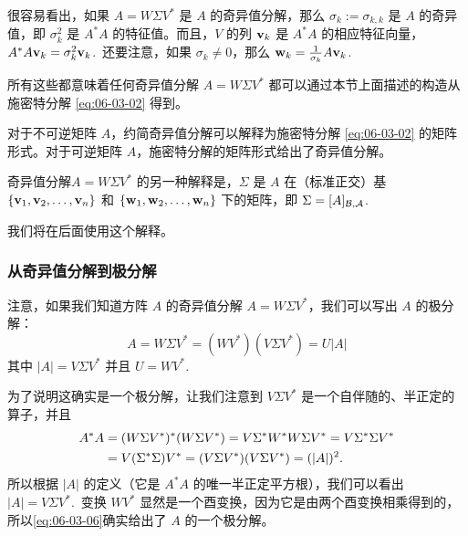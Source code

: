 \begin{remark}\label{stmt:06-03-10}
很容易看出，如果 $A = W \Sigma V^*$ 是 $A$ 的奇异值分解，那么 $\sigma_k := \sigma_{k,k}$ 是 $A$ 的奇异值，即 $\sigma_k^2$ 是 $A^*A$ 的特征值。而且，$V$ 的列 $\mathbf{v}_k$ 是 $A^*A$ 的相应特征向量，$A^*A\mathbf{v}_k = \sigma_k^2 \mathbf{v}_k$.~还要注意，如果 $\sigma_k \neq 0$，那么 $\mathbf{w}_k = \frac{1}{\sigma_k} A\mathbf{v}_k$.~
\end{remark}

所有这些都意味着任何奇异值分解 $A = W \Sigma V^*$ 都可以通过本节上面描述的构造从施密特分解 \eqref{eq:06-03-02} 得到。

对于不可逆矩阵 $A$，约简奇异值分解可以解释为施密特分解 \eqref{eq:06-03-02} 的矩阵形式。对于可逆矩阵 $A$，施密特分解的矩阵形式给出了奇异值分解。

\begin{remark}\label{stmt:06-03-11}
奇异值分解$A = W \Sigma V^*$ 的另一种解释是，$\Sigma$ 是 $A$ 在（标准正交）基 $\{\mathbf{v}_1, \mathbf{v}_2, \dots, \mathbf{v}_n\}$ 和 $\{\mathbf{w}_1, \mathbf{w}_2, \dots, \mathbf{w}_n\}$ 下的矩阵，即 $\Sigma = [A]_{\mathcal{B},\mathcal{A}}$.~
\end{remark}

我们将在后面使用这个解释。

\subsubsection{从奇异值分解到极分解}\label{sec:06-03-04-01}

注意，如果我们知道方阵 $A$ 的奇异值分解 $A = W \Sigma V^*$，我们可以写出 $A$ 的极分解：
\begin{equation}\label{eq:06-03-06}
A = W \Sigma V^* = (WV^*) (V \Sigma V^*) = U|A|
\end{equation}
其中 $|A| = V \Sigma V^*$ 并且 $U = WV^*$.~

为了说明这确实是一个极分解，让我们注意到 $V\Sigma V^*$ 是一个自伴随的、半正定的算子，并且
\begin{equation} \notag
\begin{split}A^*A &= (W\Sigma V^*)^*(W\Sigma V^*) = V \Sigma^* W^* W \Sigma V^* = V \Sigma^*\Sigma V^* \\
&= V (\Sigma^* \Sigma) V^* = (V \Sigma V^*)(V \Sigma V^*) = (|A|)^2.
\end{split}
\end{equation}
所以根据 $|A|$ 的定义（它是 $A^*A$ 的唯一半正定平方根），我们可以看出 $|A| = V \Sigma V^*$.~变换 $WV^*$ 显然是一个酉变换，因为它是由两个酉变换相乘得到的，所以\eqref{eq:06-03-06}确实给出了 $A$ 的一个极分解。

